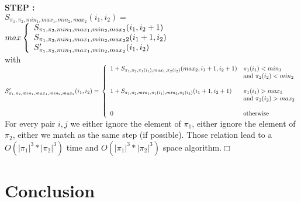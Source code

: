 \documentclass[a4paper]{llncs}
\begin{document}
	\textbf{STEP :} \\	
	
	$S_{\pi_1,\pi_2,min_1,max_1,min_2,max_2}(i_1,i_2) =$\\
	\indent $ max \left\{ 
			\begin{array}{l l}
				S_{\pi_1,\pi_2,min_1,max_1,min_2,max_2}(i_1,i_2+1) \\
				S_{\pi_1,\pi_2,min_1,max_1,min_2,max_22}(i_1+1,i_2) \\
				S'_{\pi_1,\pi_2,min_1,max_1,min_2,max_2}(i_1,i_2)
			\end{array} \right. $\vspace{20pt}\\	
	
	with 
	$S'_{\pi_1,\pi_2,min_1,max_1,min_2,max_2}(i_1,i_2)=\\ \left\{ 
				\begin{array}{l l}
					1+S_{\pi_1,\pi_2,\pi_1(i_1),max_1,\pi_2(i_2)}(max_2,i_1+1,i_2+1)  & \text{$\pi_1(i_1)<min_1$ } \\
					& \text{and $\pi_2(i_2)<min_2$} \\
					&\\
					1+S_{\pi_1,\pi_2,min_1,\pi_1(i_1),min_2,\pi_2(i_2)}(i_1+1,i_2+1)  & \text{$\pi_1(i_1)>max_1$ } \\	
					&\text{and $\pi_2(i_2)>max_2$}\\	
					&\\	
					0 & \text{otherwise}\\							
				\end{array} \right.$\\
				
	For every pair $i,j$ we either ignore the element of $\pi_1$,
	either ignore the element of $\pi_2$, 
	either we match as the same step (if possible).
	Those relation lead to a $O(|\pi_1|^3*|\pi_2|^3)$ time and $O(|\pi_1|^3*|\pi_2|^3)$ space algorithm.$\Box$ 		



			
%		
%		
	
	
		
	\section{Conclusion}
		


		  					
{}
	
			
				      
\end{document}
